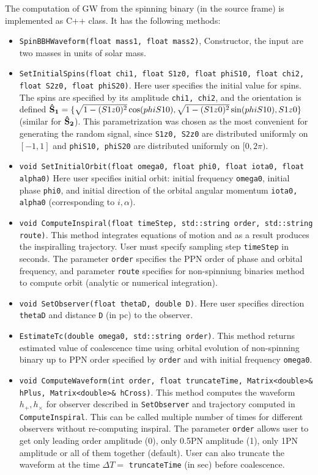 \documentclass[11pt]{report}
\def\bSo{{\bf \hat{S}_1}}
\def\bSt{{\bf \hat{S}_2}}
\begin{document}
The computation of GW from the spinning binary (in the source frame)
is implemented as  C++ class. It has the following methods:
\begin{itemize}
\item {\tt SpinBBHWaveform(float mass1, float mass2)}, Constructor, the
input are two masses in units of solar mass.

\item {\tt SetInitialSpins(float chi1, float S1z0, float phiS10, float chi2, float S2z0,
		   float phiS20)}. Here user specifies the initial value for spins.
The spins are specified by its amplitude {\tt chi1, chi2}, and the orientation
is defined $\bSo = \{ \sqrt{1-(S1z0)^2}\cos(phiS10), \sqrt{1-(S1z0)^2}\sin(phiS10),
S1z0\}$ (similar for $\bSt$). 
This parametrization was chosen as the most convenient for generating the 
random signal, since {\tt S1z0, S2z0} are distributed uniformly on $[-1,1]$ and
{\tt phiS10, phiS20} are distributed uniformly on $[0, 2\pi)$. 

\item {\tt void SetInitialOrbit(float omega0, float phi0, float iota0, float alpha0)}
Here user specifies initial orbit: initial frequency {\tt omega0}, initial
 phase {\tt phi0}, and initial direction of the orbital angular momentum 
 {\tt iota0, alpha0} (corresponding to $i,\alpha$). 
 
\item {\tt void ComputeInspiral(float timeStep, std::string order, std::string route)}. This method integrates 
equations of motion and as a result produces the inspiralling trajectory.
User must specify sampling step {\tt timeStep} in seconds.
The parameter {\tt order} specifies the PPN order of phase
and orbital frequency, and parameter {\tt route} specifies
for non-spinniung binaries method to compute orbit 
(analytic or numerical integration).

\item {\tt void SetObserver(float thetaD, double D)}. Here user specifies direction
{\tt thetaD} and distance {\tt D} (in pc) to the observer.

\item {\tt EstimateTc(double omega0, std::string order)}.
This method returns estimated value of coalescence time
using orbital evolution of non-spinning binary up to
PPN order specified by {\tt order} and with initial frequency
{\tt omega0}.

\item {\tt void ComputeWaveform(int order, float truncateTime, Matrix<double>\& hPlus, Matrix<double>\& hCross)}. This method computes the waveform $h_+, h_{\times}$ for observer 
described in {\tt SetObserver} and trajectory computed in {\tt ComputeInspiral}.
This can be called multiple number of times for different observers without 
re-computing inspiral. The parameter {\tt order} allows user to get only leading
order amplitude (0), only 0.5PN amplitude (1), only 1PN amplitude or all of them
together (default). User can also truncate the waveform at the time
$\Delta T = $  {\tt truncateTime} (in sec) before coalescence. 

\end{itemize}
\end{document}
